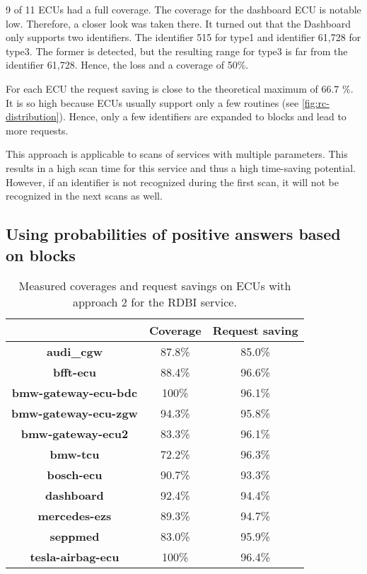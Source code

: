 9 of 11 ECUs had a full coverage. The coverage for the dashboard ECU is notable low. Therefore, a closer look was taken there. It turned out that the Dashboard only supports two identifiers. The identifier 515 for type1 and identifier 61,728 for type3. The former is detected, but the resulting range for type3 is far from the identifier 61,728. Hence, the loss and a coverage of 50\%.

For each ECU the request saving is close to the theoretical maximum of $66.7$ \%. It is so high because ECUs usually support only a few routines (see \autoref{fig:rc-distribution}). Hence, only a few identifiers are expanded to blocks and lead to more requests.

This approach is applicable to scans of services with multiple parameters. This results in a high scan time for this service and thus a high time-saving potential. However, if an identifier is not recognized during the first scan, it will not be recognized in the next scans as well.


\subsection{Using probabilities of positive answers based on blocks}

\begin{table}[H]
    \begin{center}
    \begin{tabular}{ccc}
        \hline
        & \textbf{Coverage} & \textbf{Request saving} \\
        \hline
        \textbf{audi\_cgw} & 87.8\% & 85.0\% \\
        \textbf{bfft-ecu} & 88.4\% & 96.6\% \\
        \textbf{bmw-gateway-ecu-bdc} & 100\% & 96.1\% \\
        \textbf{bmw-gateway-ecu-zgw} & 94.3\% & 95.8\% \\
        \textbf{bmw-gateway-ecu2} & 83.3\% & 96.1\% \\
        \textbf{bmw-tcu} & 72.2\% & 96.3\% \\
        \textbf{bosch-ecu} & 90.7\% & 93.3\% \\
        \textbf{dashboard} & 92.4\% & 94.4\% \\
        \textbf{mercedes-ezs} & 89.3\% & 94.7\% \\
        \textbf{seppmed} & 83.0\% & 95.9\% \\
        \textbf{tesla-airbag-ecu} & 100\% & 96.4\% \\
        \hline
    \end{tabular}
    \end{center}
    \caption{Measured coverages and request savings on ECUs with approach 2 for the RDBI service.}
    \label{tab:evaluation-approach2}
\end{table}


